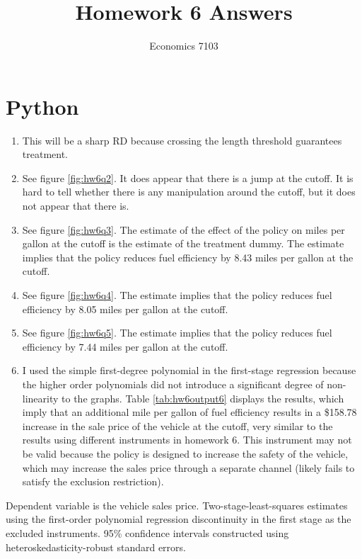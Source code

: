 \documentclass{article}
\title{Homework 6 Answers}
\author{Economics 7103}
\date{ }
\begin{document}
  
\maketitle

\section{Python}

\begin{enumerate}
    \item This will be a sharp RD because crossing the length threshold guarantees treatment. 
    \item See figure \ref{fig:hw6q2}.  It does appear that there is a jump at the cutoff.  It is hard to tell whether there is any manipulation around the cutoff, but it does not appear that there is.
    \item See figure \ref{fig:hw6q3}.  The estimate of the effect of the policy on miles per gallon at the cutoff is the estimate of the treatment dummy.  The estimate implies that the policy reduces fuel efficiency by 8.43 miles per gallon at the cutoff.
    \item See figure \ref{fig:hw6q4}.  The estimate implies that the policy reduces fuel efficiency by 8.05 miles per gallon at the cutoff.
    \item See figure \ref{fig:hw6q5}.  The estimate implies that the policy reduces fuel efficiency by 7.44 miles per gallon at the cutoff.
    \item I used the simple first-degree polynomial in the first-stage regression because the higher order polynomials did not introduce a significant degree of non-linearity to the graphs.  Table \ref{tab:hw6output6} displays the results, which imply that an additional mile per gallon of fuel efficiency results in a \$158.78 increase in the sale price of the vehicle at the cutoff, very similar to the results using different instruments in homework 6.  This instrument may not be valid because the policy is designed to increase the safety of the vehicle, which may increase the sales price through a separate channel (likely fails to satisfy the exclusion restriction).
\end{enumerate}

\begin{table}[ht]
    \centering
   
    \caption{Dependent variable is the vehicle sales price. Two-stage-least-squares estimates using the first-order polynomial regression discontinuity in the first stage as the excluded instruments.  95\% confidence intervals constructed using heteroskedasticity-robust standard errors.}
    \label{tab:hw6output6}
\end{table}
\end{document}
